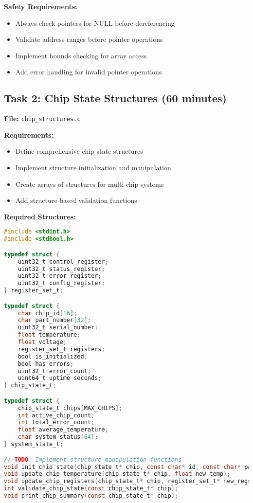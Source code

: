 \documentclass[11pt,a4paper]{article}
\begin{document}
\textbf{Safety Requirements:}
\begin{itemize}
    \item Always check pointers for NULL before dereferencing
    \item Validate address ranges before pointer operations
    \item Implement bounds checking for array access
    \item Add error handling for invalid pointer operations
\end{itemize}

\subsection{Task 2: Chip State Structures (60 minutes)}

\textbf{File:} \texttt{chip\_structures.c}

\textbf{Requirements:}
\begin{itemize}
    \item Define comprehensive chip state structures
    \item Implement structure initialization and manipulation
    \item Create arrays of structures for multi-chip systems
    \item Add structure-based validation functions
\end{itemize}

\textbf{Required Structures:}
\begin{lstlisting}[language=C]
#include <stdint.h>
#include <stdbool.h>

typedef struct {
    uint32_t control_register;
    uint32_t status_register;
    uint32_t error_register;
    uint32_t config_register;
} register_set_t;

typedef struct {
    char chip_id[16];
    char part_number[32];
    uint32_t serial_number;
    float temperature;
    float voltage;
    register_set_t registers;
    bool is_initialized;
    bool has_errors;
    uint32_t error_count;
    uint64_t uptime_seconds;
} chip_state_t;

typedef struct {
    chip_state_t chips[MAX_CHIPS];
    int active_chip_count;
    int total_error_count;
    float average_temperature;
    char system_status[64];
} system_state_t;

// TODO: Implement structure manipulation functions
void init_chip_state(chip_state_t* chip, const char* id, const char* part_num);
void update_chip_temperature(chip_state_t* chip, float new_temp);
void update_chip_registers(chip_state_t* chip, register_set_t* new_regs);
int validate_chip_state(const chip_state_t* chip);
void print_chip_summary(const chip_state_t* chip);
\end{lstlisting}
\end{document}
